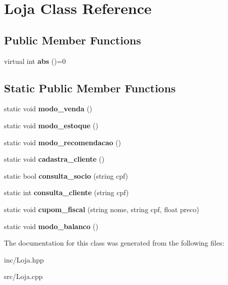 \hypertarget{class_loja}{}\section{Loja Class Reference}
\label{class_loja}
\subsection*{Public Member Functions}
\begin{DoxyCompactItemize}
\item 
virtual int {\bfseries abs} ()=0\hypertarget{class_loja_a891ad86180f9bdc3b2d97592b51d36a2}{}\label{class_loja_a891ad86180f9bdc3b2d97592b51d36a2}

\end{DoxyCompactItemize}
\subsection*{Static Public Member Functions}
\begin{DoxyCompactItemize}
\item 
static void {\bfseries modo\+\_\+venda} ()\hypertarget{class_loja_a5e9ae50837083855335d4f9dd58d7615}{}\label{class_loja_a5e9ae50837083855335d4f9dd58d7615}

\item 
static void {\bfseries modo\+\_\+estoque} ()\hypertarget{class_loja_a6480b80d0a09a532267d8f388d866005}{}\label{class_loja_a6480b80d0a09a532267d8f388d866005}

\item 
static void {\bfseries modo\+\_\+recomendacao} ()\hypertarget{class_loja_a468423ff1ac93d7a65d24f52eafe2276}{}\label{class_loja_a468423ff1ac93d7a65d24f52eafe2276}

\item 
static void {\bfseries cadastra\+\_\+cliente} ()\hypertarget{class_loja_a046efae41cdbf838169aaa1773249842}{}\label{class_loja_a046efae41cdbf838169aaa1773249842}

\item 
static bool {\bfseries consulta\+\_\+socio} (string cpf)\hypertarget{class_loja_a1b6910218ccb9274dcbb6635fdb562f8}{}\label{class_loja_a1b6910218ccb9274dcbb6635fdb562f8}

\item 
static int {\bfseries consulta\+\_\+cliente} (string cpf)\hypertarget{class_loja_af77ca2356affc8acc06abaac4ce72962}{}\label{class_loja_af77ca2356affc8acc06abaac4ce72962}

\item 
static void {\bfseries cupom\+\_\+fiscal} (string nome, string cpf, float preco)\hypertarget{class_loja_aa6792e6f3f268652266275fc0d096fab}{}\label{class_loja_aa6792e6f3f268652266275fc0d096fab}

\item 
static void {\bfseries modo\+\_\+balanco} ()\hypertarget{class_loja_a483d73b9661da5d7ce556ddde427e3f7}{}\label{class_loja_a483d73b9661da5d7ce556ddde427e3f7}

\end{DoxyCompactItemize}


The documentation for this class was generated from the following files\+:\begin{DoxyCompactItemize}
\item 
inc/Loja.\+hpp\item 
src/Loja.\+cpp\end{DoxyCompactItemize}
